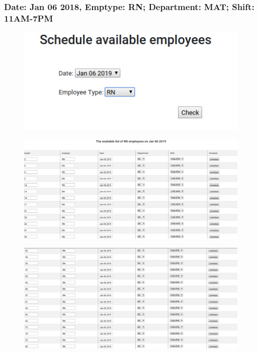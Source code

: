 \documentclass[11pt]{article}
\makeatletter
\def\maxwidth{\ifdim\Gin@nat@width>\linewidth\linewidth
    \else\Gin@nat@width\fi}
\let\Oldincludegraphics\includegraphics
\renewcommand{\includegraphics}[1]{\Oldincludegraphics[width=.8\maxwidth]{#1}}
\makeatother
\begin{document}
    \subsubsection*{Date: Jan 06 2018, Emptype: RN; Department: MAT; Shift:
11AM-7PM}\label{date-jan-06-2018-emptype-rn-department-mat-shift-11am-7pm}

\begin{figure}[H]
	\centering
	\includegraphics{16.png}
	\caption{}
\end{figure}

\begin{figure}[H]
	\centering
	\includegraphics{18.png}
	\caption{}
\end{figure}

\begin{figure}[H]
	\centering
	\includegraphics{19.png}
	\caption{}
\end{figure}
\end{document}
